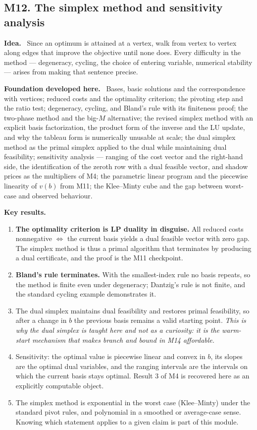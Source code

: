 \documentclass[11pt,a4paper]{article}
\newcommand{\mpart}[1]{\smallskip\noindent\textbf{#1}\ \ignorespaces}
\begin{document}
\subsection{M12. The simplex method and sensitivity analysis}

\mpart{Idea.} Since an optimum is attained at a vertex, walk from vertex to vertex along edges
that improve the objective until none does. Every difficulty in the method --- degeneracy,
cycling, the choice of entering variable, numerical stability --- arises from making that
sentence precise.

\mpart{Foundation developed here.} Bases, basic solutions and the correspondence with
vertices; reduced costs and the optimality criterion; the pivoting step and the ratio test;
degeneracy, cycling, and Bland's rule with its finiteness proof; the two-phase method and the
big-$M$ alternative; the revised simplex method with an explicit basis factorization, the
product form of the inverse and the LU update, and why the tableau form is numerically
unusable at scale; the dual simplex method as the primal simplex applied to the dual while
maintaining dual feasibility; sensitivity analysis --- ranging of the cost vector and the
right-hand side, the identification of the zeroth row with a dual feasible vector, and shadow
prices as the multipliers of M4; the parametric linear program and the piecewise linearity of
$v(b)$ from M11; the Klee--Minty cube and the gap between worst-case and observed behaviour.

\mpart{Key results.}
\begin{enumerate}
\item \textbf{The optimality criterion is LP duality in disguise.} All reduced costs
nonnegative $\iff$ the current basis yields a dual feasible vector with zero gap. The simplex
method is thus a primal algorithm that terminates by producing a dual certificate, and the
proof is the M11 checkpoint.
\item \textbf{Bland's rule terminates.} With the smallest-index rule no basis repeats, so the
method is finite even under degeneracy; Dantzig's rule is not finite, and the standard cycling
example demonstrates it.
\item The dual simplex maintains dual feasibility and restores primal feasibility, so after a
change in $b$ the previous basis remains a valid starting point. \emph{This is why the dual
simplex is taught here and not as a curiosity: it is the warm-start mechanism that makes
branch and bound in M14 affordable.}
\item Sensitivity: the optimal value is piecewise linear and convex in $b$, its slopes are the
optimal dual variables, and the ranging intervals are the intervals on which the current basis
stays optimal. Result 3 of M4 is recovered here as an explicitly computable object.
\item The simplex method is exponential in the worst case (Klee--Minty) under the standard
pivot rules, and polynomial in a smoothed or average-case sense. Knowing which statement
applies to a given claim is part of this module.
\end{enumerate}
\end{document}
